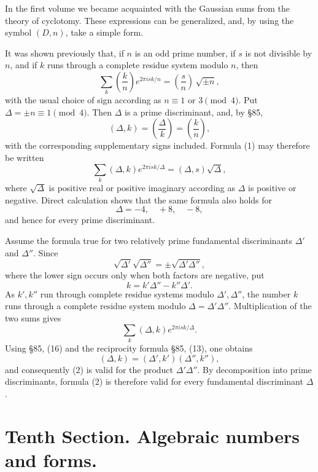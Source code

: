 \documentclass[11pt]{article}
\newcommand{\Jac}[2]{\left(\frac{#1}{#2}\right)}
\begin{document}
In the first volume we became acquainted with the Gaussian sums from the theory of cyclotomy.  These expressions can be generalized, and, by using the symbol \((D,n)\), take a simple form.

It was shown previously that, if \(n\) is an odd prime number, if \(s\) is not divisible by \(n\), and if \(k\) runs through a complete residue system modulo \(n\), then
\begin{equation}
        \sum_k \Jac{k}{n}e^{2\pi isk/n}=\Jac{s}{n}\,\sqrt{\pm n},
\tag{1}
\end{equation}
with the usual choice of sign according as \(n\equiv1\) or \(3\pmod4\).  Put \(\Delta=\pm n\equiv1\pmod4\).  Then \(\Delta\) is a prime discriminant, and, by \S 85,
\[
        (\Delta,k)=\Jac{\Delta}{k}=\Jac{k}{n},
\]
with the corresponding supplementary signs included.  Formula (1) may therefore be written
\begin{equation}
        \sum_k (\Delta,k)e^{2\pi isk/\Delta}=(\Delta,s)\sqrt{\Delta},
\tag{2}
\end{equation}
where \(\sqrt{\Delta}\) is positive real or positive imaginary according as \(\Delta\) is positive or negative.  Direct calculation shows that the same formula also holds for
\[
        \Delta=-4,\quad +8,\quad -8,
\]
and hence for every prime discriminant.

Assume the formula true for two relatively prime fundamental discriminants \(\Delta'
\) and \(\Delta''\).  Since
\begin{equation}
        \sqrt{\Delta'}\sqrt{\Delta''}=\pm\sqrt{\Delta'\Delta''},
\tag{3}
\end{equation}
where the lower sign occurs only when both factors are negative, put
\[
        k=k'\Delta''-k''\Delta'.
\]
As \(k',k''\) run through complete residue systems modulo \(\Delta',\Delta''\), the number \(k\) runs through a complete residue system modulo \(\Delta=\Delta'\Delta''\).  Multiplication of the two sums gives
\begin{equation}
        \sum_k(\Delta,k)e^{2\pi isk/\Delta}.
\tag{5}
\end{equation}
Using \S 85, (16) and the reciprocity formula \S 85, (13), one obtains
\[
        (\Delta,k)=(\Delta',k')(
\Delta'',k''),
\]
and consequently (2) is valid for the product \(\Delta'\Delta''\).  By decomposition into prime discriminants, formula (2) is therefore valid for every fundamental discriminant \(\Delta\).


\section*{Tenth Section. Algebraic numbers and forms.}
\end{document}
